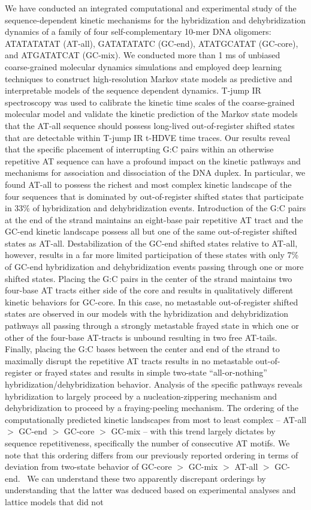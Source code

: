 \documentclass[journal=jpcbfk,manuscript=article]{achemso}
\begin{document}
We have conducted an integrated computational and experimental study of the sequence-dependent kinetic mechanisms for the hybridization and dehybridization dynamics of a family of four self-complementary 10-mer DNA oligomers: ATATATATAT (AT-all), GATATATATC (GC-end), ATATGCATAT (GC-core), and ATGATATCAT (GC-mix). We conducted more than 1 ms of unbiased coarse-grained molecular dynamics simulations and employed deep learning techniques to construct high-resolution Markov state models as predictive and interpretable models of the sequence dependent dynamics. T-jump IR spectroscopy was used to calibrate the kinetic time scales of the coarse-grained molecular model and validate the kinetic prediction of the Markov state models that the AT-all sequence should possess long-lived out-of-register shifted states that are detectable within T-jump IR t-HDVE time traces. Our results reveal that the specific placement of interrupting G:C pairs within an otherwise repetitive AT sequence can have a profound impact on the kinetic pathways and mechanisms for association and dissociation of the DNA duplex. In particular, we found AT-all to possess the richest and most complex kinetic landscape of the four sequences that is dominated by out-of-register shifted states that participate in 33\% of hybridization and dehybridization events. Introduction of the G:C pairs at the end of the strand maintains an eight-base pair repetitive AT tract and the GC-end kinetic landscape possess all but one of the same out-of-register shifted states as AT-all. Destabilization of the GC-end shifted states relative to AT-all, however, results in a far more limited participation of these states with only 7\% of GC-end hybridization and dehybridization events passing through one or more shifted states. Placing the G:C pairs in the center of the strand maintains two four-base AT tracts either side of the core and results in qualitatively different kinetic behaviors for GC-core. In this case, no metastable out-of-register shifted states are observed in our models with the hybridization and dehybridization pathways all passing through a strongly metastable frayed state in which one or other of the four-base AT-tracts is unbound resulting in two free AT-tails. Finally, placing the G:C bases between the center and end of the strand to maximally disrupt the repetitive AT tracts results in no metastable out-of-register or frayed states and results in simple two-state ``all-or-nothing'' hybridization/dehybridization behavior. Analysis of the specific pathways reveals hybridization to largely proceed by a nucleation-zippering mechanism and dehybridization to proceed by a fraying-peeling mechanism. The ordering of the computationally predicted kinetic landscapes from most to least complex -- AT-all $>$ GC-end $>$ GC-core $>$ GC-mix -- with this trend largely dictates by sequence repetitiveness, specifically the number of consecutive AT motifs. We note that this ordering differs from our previously reported ordering in terms of deviation from two-state behavior of GC-core $>$ GC-mix $>$ AT-all $>$ GC-end.~\citep{Sanstead2016, Sanstead2018DirectDehybridization} We can understand these two apparently discrepant orderings by understanding that the latter was deduced based on experimental analyses and lattice models that did not 
\end{document}
